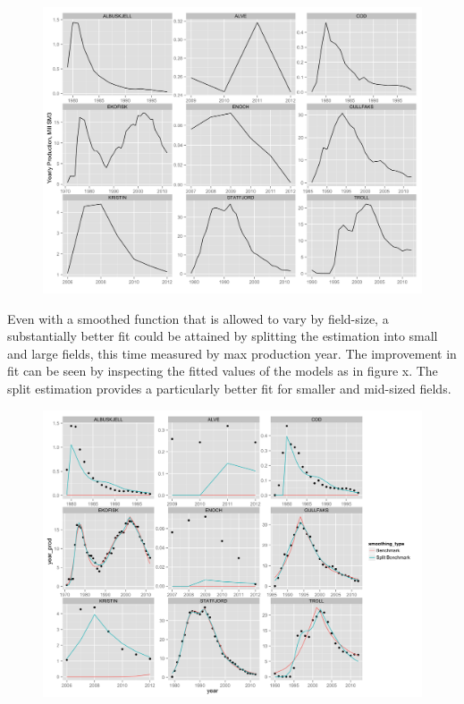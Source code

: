 \documentclass[12pt]{scrartcl} %
\begin{document}
\begin{figure}
	\includegraphics[width=1\textwidth]{field_inspection.png}
\end{figure}

Even with a smoothed function that is allowed to vary by field-size, a substantially better fit could be attained by splitting the estimation into small and large fields, this time measured by max production year.  The improvement in fit can be seen by inspecting the fitted values of the models as in figure x. The split estimation provides a particularly better fit for smaller and mid-sized fields.

\begin{figure}
	\includegraphics[width=1\textwidth]{bench_vs_split.png}
\end{figure}
\end{document}
